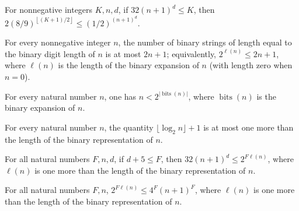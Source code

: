 \begin{theorem}
\label{Randomized.PolyAmp.two_mul_pow_le}
\leanok
{}
For nonnegative integers $K,n,d$, if $32(n+1)^d\le K$, then $2(8/9)^{\left\lfloor (K+1)/2 \right\rfloor}\le
(1/2)^{(n+1)^d}$.
\end{theorem}

\begin{theorem}
\label{Complexity.LogProg.two_pow_bits_le_two_mul_add_one}
\leanok
{}
For every nonnegative integer $n$, the number of binary strings of length equal to the
binary digit length of $n$ is at most $2n+1$; equivalently, $2^{\ell(n)}\le 2n+1$, where
$\ell(n)$ is the length of the binary expansion of $n$ (with length zero when $n=0$).
\end{theorem}

\begin{theorem}
\label{Complexity.LogProg.lt_two_pow_bits}
\leanok
{}
For every natural number $n$, one has $n < 2^{\lvert\operatorname{bits}(n)\rvert}$,
where $\operatorname{bits}(n)$ is the binary expansion of $n$.
\end{theorem}

\begin{theorem}
\label{Randomized.PolyAmp.logSpace_le_ell}
\leanok
{}
For every natural number $n$, the quantity $\lfloor\log_2 n\rfloor+1$ is at most one
more than the length of the binary representation of $n$.
\end{theorem}

\begin{theorem}
\label{Randomized.PolyAmp.bigK_ge}
\leanok
{}
For all natural numbers $F,n,d$, if $d+5\le F$, then $32(n+1)^d\le 2^{F\ell(n)}$, where
$\ell(n)$ is one more than the length of the binary representation of $n$.
\end{theorem}

\begin{theorem}
\label{Randomized.PolyAmp.bigK_le}
\leanok
{}
For all natural numbers $F,n$, $2^{F\ell(n)}\le 4^F(n+1)^F$, where $\ell(n)$ is one more
than the length of the binary representation of $n$.
\end{theorem}

